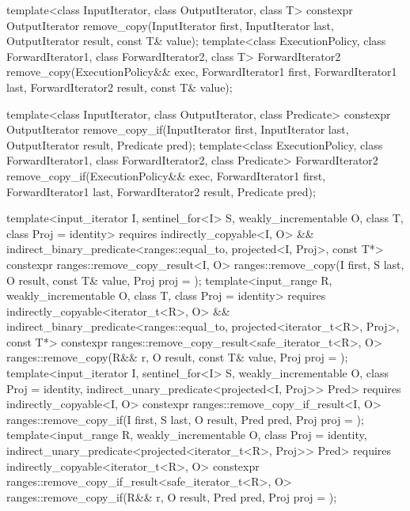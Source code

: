 %
%
\begin{itemdecl}
template<class InputIterator, class OutputIterator, class T>
  constexpr OutputIterator
    remove_copy(InputIterator first, InputIterator last,
                OutputIterator result, const T& value);
template<class ExecutionPolicy, class ForwardIterator1, class ForwardIterator2,
         class T>
  ForwardIterator2
    remove_copy(ExecutionPolicy&& exec,
                ForwardIterator1 first, ForwardIterator1 last,
                ForwardIterator2 result, const T& value);

template<class InputIterator, class OutputIterator, class Predicate>
  constexpr OutputIterator
    remove_copy_if(InputIterator first, InputIterator last,
                   OutputIterator result, Predicate pred);
template<class ExecutionPolicy, class ForwardIterator1, class ForwardIterator2,
         class Predicate>
  ForwardIterator2
    remove_copy_if(ExecutionPolicy&& exec,
                   ForwardIterator1 first, ForwardIterator1 last,
                   ForwardIterator2 result, Predicate pred);

template<input_iterator I, sentinel_for<I> S, weakly_incrementable O, class T,
         class Proj = identity>
  requires indirectly_copyable<I, O> &&
           indirect_binary_predicate<ranges::equal_to, projected<I, Proj>, const T*>
  constexpr ranges::remove_copy_result<I, O>
    ranges::remove_copy(I first, S last, O result, const T& value, Proj proj = {});
template<input_range R, weakly_incrementable O, class T, class Proj = identity>
  requires indirectly_copyable<iterator_t<R>, O> &&
           indirect_binary_predicate<ranges::equal_to, projected<iterator_t<R>, Proj>, const T*>
  constexpr ranges::remove_copy_result<safe_iterator_t<R>, O>
    ranges::remove_copy(R&& r, O result, const T& value, Proj proj = {});
template<input_iterator I, sentinel_for<I> S, weakly_incrementable O,
         class Proj = identity, indirect_unary_predicate<projected<I, Proj>> Pred>
  requires indirectly_copyable<I, O>
  constexpr ranges::remove_copy_if_result<I, O>
    ranges::remove_copy_if(I first, S last, O result, Pred pred, Proj proj = {});
template<input_range R, weakly_incrementable O, class Proj = identity,
         indirect_unary_predicate<projected<iterator_t<R>, Proj>> Pred>
  requires indirectly_copyable<iterator_t<R>, O>
  constexpr ranges::remove_copy_if_result<safe_iterator_t<R>, O>
    ranges::remove_copy_if(R&& r, O result, Pred pred, Proj proj = {});
\end{itemdecl}

